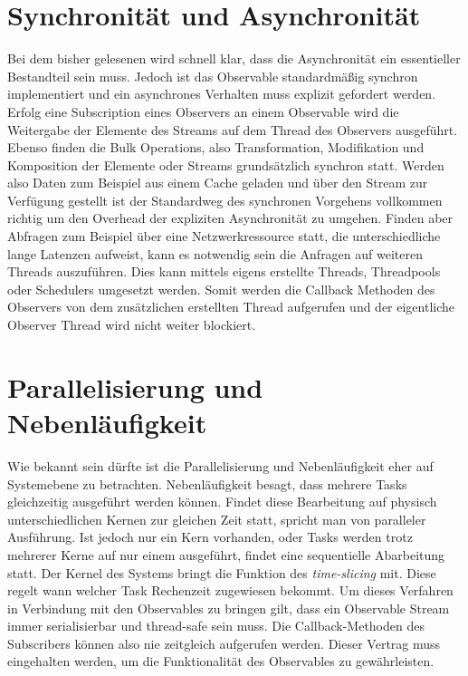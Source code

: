 \section{Synchronität und Asynchronität}
Bei dem bisher gelesenen wird schnell klar, dass die Asynchronität ein essentieller Bestandteil sein muss. Jedoch ist das Observable standardmäßig synchron implementiert und ein asynchrones Verhalten muss explizit gefordert werden. Erfolg eine Subscription eines Observers an einem Observable wird die Weitergabe der Elemente des Streams auf dem Thread des Observers ausgeführt. Ebenso finden die Bulk Operations, also Transformation, Modifikation und Komposition der Elemente oder Streams grundsätzlich synchron statt. Werden also Daten zum Beispiel aus einem Cache geladen und über den Stream zur Verfügung gestellt ist der Standardweg des synchronen Vorgehens vollkommen richtig um den Overhead der expliziten Asynchronität zu umgehen. Finden aber Abfragen zum Beispiel über eine Netzwerkressource statt, die unterschiedliche lange Latenzen aufweist, kann es notwendig sein die Anfragen auf weiteren Threads auszuführen. Dies kann mittels eigens erstellte Threads, Threadpools oder Schedulers umgesetzt werden. Somit werden die Callback Methoden des Observers von dem zusätzlichen erstellten Thread aufgerufen und der eigentliche Observer Thread wird nicht weiter blockiert.
\section{Parallelisierung und Nebenläufigkeit}
Wie bekannt sein dürfte ist die Parallelisierung und Nebenläufigkeit eher auf Systemebene zu betrachten. Nebenläufigkeit besagt, dass mehrere Tasks gleichzeitig ausgeführt werden können. Findet diese Bearbeitung auf physisch unterschiedlichen Kernen zur gleichen Zeit statt, spricht man von paralleler Ausführung. Ist jedoch nur ein Kern vorhanden, oder Tasks werden trotz mehrerer Kerne auf nur einem ausgeführt, findet eine sequentielle Abarbeitung statt. Der Kernel des Systems bringt die Funktion des \textit{time-slicing} mit. Diese regelt wann welcher Task Rechenzeit zugewiesen bekommt. Um dieses Verfahren in Verbindung mit den Observables zu bringen gilt, dass ein Observable Stream immer serialisierbar und thread-safe sein muss. Die Callback-Methoden des Subscribers können also nie zeitgleich aufgerufen werden. Dieser Vertrag muss eingehalten werden, um die Funktionalität des Observables zu gewährleisten.
